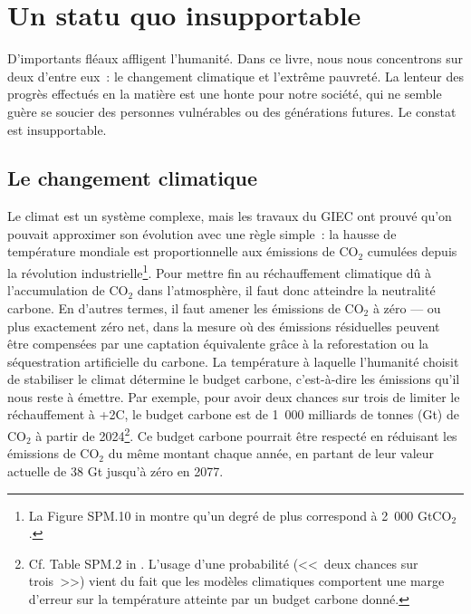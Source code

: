 \documentclass[a5paper,french,openany]{memoir}
\begin{document}
\chapter{Un statu quo insupportable\label{ch:statu_quo}}

D'importants fléaux affligent l'humanité. Dans ce livre, nous nous 
concentrons sur deux d'entre eux~: le changement climatique et l'extrême pauvreté. La lenteur des progrès effectués en la matière est une honte pour notre société, qui ne semble guère se soucier des personnes vulnérables ou des générations futures. Le constat est insupportable.

\section{Le changement climatique}

Le climat est un système complexe, mais les travaux du GIEC ont prouvé qu'on pouvait approximer son évolution avec une règle simple~: la hausse de température mondiale est proportionnelle aux émissions de CO$_\text{2}$ cumulées depuis la révolution industrielle\footnote{La Figure SPM.10 in \citet{ipcc_climate_2021} montre qu'un degré de plus correspond à 2~000 GtCO$_\text{2}$.}. 
Pour mettre fin au réchauffement climatique dû à l'accumulation de CO$_\text{2}$ dans l'atmosphère, il faut donc atteindre la neutralité carbone. En d'autres termes, il faut amener les émissions de CO$_\text{2}$ à zéro --- ou plus exactement zéro net, dans la mesure où des émissions résiduelles peuvent être compensées par une captation équivalente grâce à la reforestation ou la séquestration artificielle du carbone. La température à laquelle l'humanité choisit de stabiliser le climat détermine le budget carbone, c'est-à-dire les émissions qu'il nous reste à émettre. Par exemple, pour avoir deux chances sur trois de limiter le réchauffement à +2\textdegree{}C, le budget carbone est de 1~000 milliards de tonnes (Gt) de CO$_\text{2}$ à partir de 2024\footnote{Cf. Table SPM.2 in \citet{ipcc_climate_2021}. L'usage d'une probabilité (<<~deux chances sur trois~>>) vient du fait que les modèles climatiques comportent une marge d'erreur sur la température atteinte par un budget carbone donné.}. 
Ce budget carbone pourrait être respecté en réduisant les émissions de CO$_\text{2}$ du même montant chaque année, en partant de leur valeur actuelle de 38 Gt jusqu'à zéro en 2077. 
\end{document}
